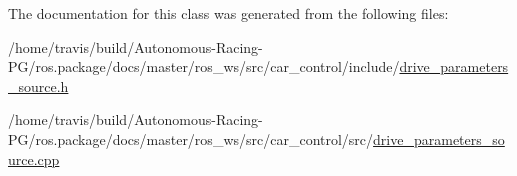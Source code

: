 The documentation for this class was generated from the following files\+:\begin{DoxyCompactItemize}
\item 
/home/travis/build/\+Autonomous-\/\+Racing-\/\+P\+G/ros.\+package/docs/master/ros\+\_\+ws/src/car\+\_\+control/include/\hyperlink{drive__parameters__source_8h}{drive\+\_\+parameters\+\_\+source.\+h}\item 
/home/travis/build/\+Autonomous-\/\+Racing-\/\+P\+G/ros.\+package/docs/master/ros\+\_\+ws/src/car\+\_\+control/src/\hyperlink{drive__parameters__source_8cpp}{drive\+\_\+parameters\+\_\+source.\+cpp}\end{DoxyCompactItemize}
